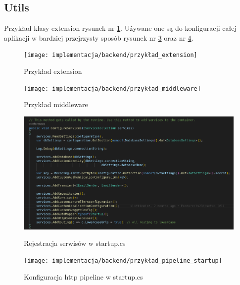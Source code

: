 \documentclass[a4paper,11pt]{report}
\begin{document}
\subsection{Utils}
Przykład klasy extension rysunek nr \ref{fig:gamitude_extension}.
Używane one są do konfiguracji całej aplikacji w bardziej przejrzysty sposób rysunek nr \ref{fig:gamitude_services_startup} oraz nr \ref{fig:gamitude_pipeline_startup}.
\begin{figure}[H]
	\centering
	\texttt{[image: implementacja/backend/przykład\_extension]}\\
	\caption{Przykład extension}
	\label{fig:gamitude_extension}
\end{figure}
\begin{figure}[H]
	\centering
	\texttt{[image: implementacja/backend/przykład\_middleware]}\\
	\caption{Przykład middleware}
	\label{fig:gamitude_middleware}
\end{figure}
\begin{figure}[H]
	\centering
	\includegraphics[scale=0.4]{implementacja/backend/register_services_startup}\\
	\caption{Rejestracja serwisów w startup.cs}
	\label{fig:gamitude_services_startup}
\end{figure}
\begin{figure}[H]
	\centering
	\texttt{[image: implementacja/backend/przykład\_pipeline\_startup]}\\
	\caption{Konfiguracja http pipeline w startup.cs}
	\label{fig:gamitude_pipeline_startup}
\end{figure}
\end{document}

